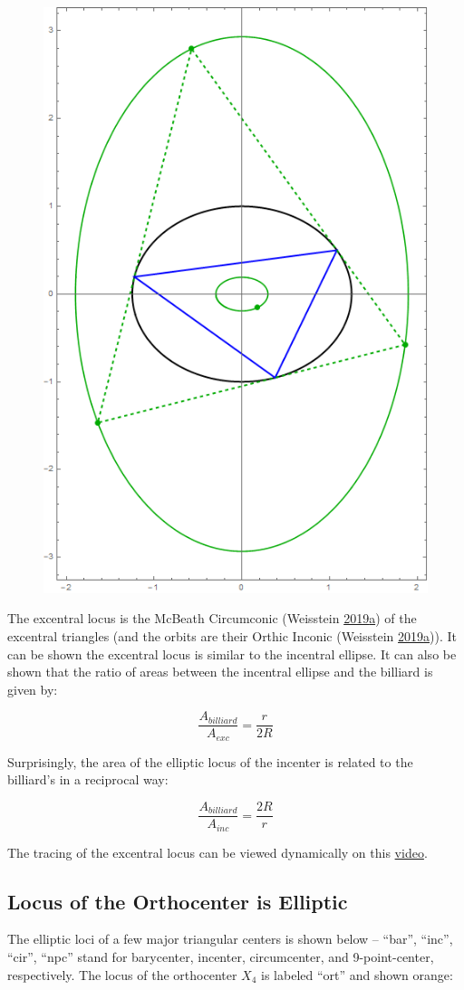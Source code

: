 \documentclass[]{article}
\begin{document}
\begin{figure}[H]

{\centering \includegraphics[width=0.33\linewidth]{pics/incentral_and_excentral_ellipses} 

}

\end{figure}

The excentral locus is the McBeath Circumconic (Weisstein \protect\hyperlink{ref-mw}{2019}\protect\hyperlink{ref-mw}{a}) of the excentral triangles (and the orbits are their Orthic Inconic (Weisstein \protect\hyperlink{ref-mw}{2019}\protect\hyperlink{ref-mw}{a})). It can be shown the excentral locus is similar to the incentral ellipse. It can also be shown that the ratio of areas between the incentral ellipse and the billiard is given by:

\[
\frac{A_{billiard}}{A_{exc}}=\frac{r}{2R}
\]

Surprisingly, the area of the elliptic locus of the incenter is related to the billiard's in a reciprocal way:

\[
\frac{A_{billiard}}{A_{inc}}=\frac{2R}{r}
\]

The tracing of the excentral locus can be viewed dynamically on this \href{https://youtu.be/EYQhjgM33TQ}{video}.

\hypertarget{locus-of-the-orthocenter-is-elliptic}{%
\subsection{Locus of the Orthocenter is Elliptic}\label{locus-of-the-orthocenter-is-elliptic}}

The elliptic loci of a few major triangular centers is shown below -- ``bar'', ``inc'', ``cir'', ``npc'' stand for barycenter, incenter, circumcenter, and 9-point-center, respectively. The locus of the orthocenter \(X_{4}\) is labeled ``ort'' and shown orange:
\end{document}
